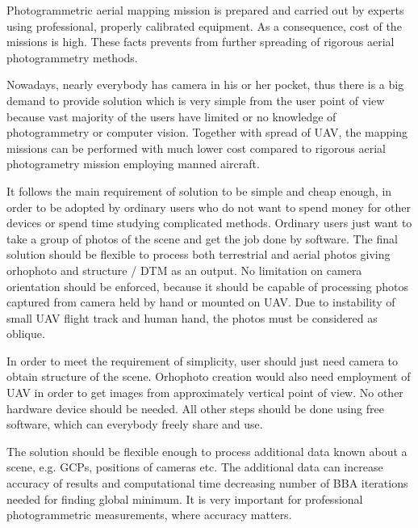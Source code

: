 \documentclass[a4paper,12pt]{article}
\begin{document}

Photogrammetric aerial mapping mission is prepared and carried out by experts using 
professional, properly calibrated equipment.
As a consequence, cost of the missions
is high. These facts prevents from further spreading of rigorous aerial photogrammetry methods.

Nowadays, nearly everybody has camera in his or her pocket, thus there is a big demand 
to provide solution which is very simple from the user point of view because 
vast majority of the users have limited or no knowledge of photogrammetry or computer vision. 
Together with spread of UAV, the mapping missions can be performed with much lower 
cost compared to rigorous aerial photogrametry mission employing manned aircraft.


It follows the main requirement 
of solution to be simple and cheap enough,
in order to be adopted by
ordinary users who do not want 
to spend money for other devices or spend time studying complicated methods. 
Ordinary users just 
want to take a group of photos of the scene and get the job done by software.
The final solution should be flexible to process both terrestrial and aerial photos
giving orhophoto and structure / DTM as an output. 
No limitation on camera orientation should be enforced, because it should be capable 
of processing photos captured from camera held by hand or mounted on UAV.
Due to instability of small UAV flight track and human hand, the photos 
must be considered as oblique. 


In order to meet the requirement of simplicity, user should just need  
 camera to obtain structure of the scene. Orhophoto creation would also need employment of UAV
in order to get images from approximately vertical point of view.
No other hardware device should be needed. 
All other steps should be done 
using free software, which can everybody freely share and use. 


The solution should be flexible enough to process additional data known about a scene, 
e.g. GCPs, positions of cameras etc. The additional data can
 increase accuracy of results and computational time  
 decreasing number of  BBA iterations needed for finding global minimum. It is very important 
 for professional photogrammetric measurements, where accuracy matters.
\end{document}
